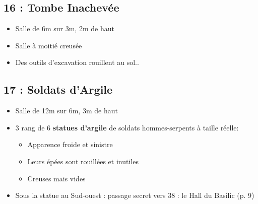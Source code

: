 \subsection{16 : Tombe Inachevée}\label{n2:s16}
\begin{itemize}
  \item Salle de 6m sur 3m, 2m de haut
  \item Salle à moitié creusée
  \item Des outils d'excavation rouillent au sol..
\end{itemize}

\vfill

\subsection{17 : Soldats d'Argile}\label{n2:s17}
\begin{itemize}
    \item Salle de 12m sur 6m, 3m de haut
    \item 3 rang de 6 \textbf{statues d'argile} de soldats hommes-serpents à taille réelle:
    \begin{itemize}
      \item Apparence froide et sinistre
      \item Leurs épées sont rouillées et inutiles
      \item Creuses mais vides
    \end{itemize}
    \item Sous la statue au Sud-ouest : passage secret vers 38 : le Hall du Basilic (p. 9)
\end{itemize}



